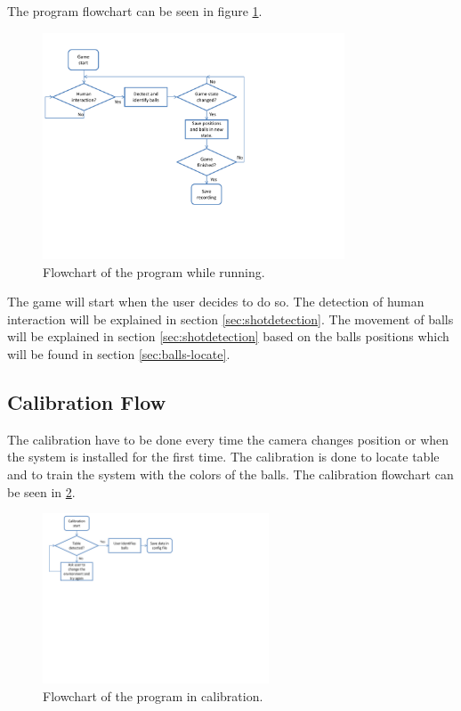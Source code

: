 The program flowchart can be seen in figure \ref{fig:program_flowchart}.

\begin{figure}[htpb]
\begin{center}
\leavevmode
\includegraphics[width=0.8\textwidth]{images/program_flowchart}
\end{center}
\caption{Flowchart of the program while running.}
\label{fig:program_flowchart}
\end{figure}

The game will start when the user decides to do so. The detection of human interaction will be explained in section \ref{sec:shotdetection}. The movement of balls will be explained in section \ref{sec:shotdetection} based on the balls positions which will be found in section \ref{sec:balls-locate}.

\subsection{Calibration Flow}
The calibration have to be done every time the camera changes position or when the system is installed for the first time. The calibration is done to locate table and to train the system with the colors of the balls. The calibration flowchart can be seen in \ref{fig:calib_flowchart}.

\begin{figure}[htpb]
\begin{center}
\leavevmode
\includegraphics[width=0.6\textwidth]{images/calib_flowchart}
\end{center}
\caption{Flowchart of the program in calibration.}
\label{fig:calib_flowchart}
\end{figure}


